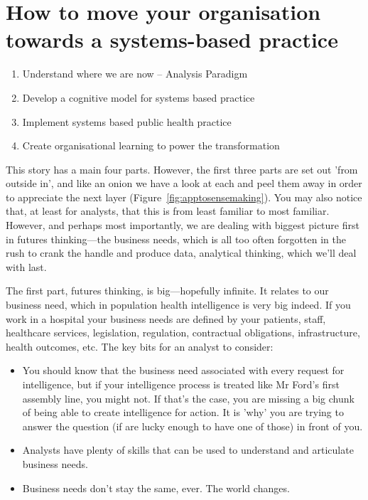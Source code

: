 \section*{How to move your organisation towards a systems-based practice}

\begin{enumerate}
	\item Understand where we are now -- Analysis Paradigm
	\item Develop a cognitive model for systems based practice
	\item Implement systems based public health practice
	\item Create organisational learning to power the transformation
\end{enumerate}

This story has a main four parts. However, the first three parts are set out 'from outside in', and like an onion we have a look at each and peel them away in order to appreciate the next layer (Figure~\ref{fig:apptosensemaking}). You may also notice that, at least for analysts, that this is from least familiar to most familiar. However, and perhaps most importantly, we are dealing with biggest picture first in futures thinking---the business needs, which is all too often forgotten in the rush to crank the handle and produce data, analytical thinking, which we'll deal with last.

The first part, futures thinking, is big---hopefully infinite. It relates to our business need, which in population health intelligence is very big indeed. If you work in a hospital your business needs are defined by your patients, staff, healthcare services, legislation, regulation, contractual obligations, infrastructure, health outcomes, etc. The key bits for an analyst to consider:
\begin{itemize}
	\item You should know that the business need associated with every request for intelligence, but if your intelligence process is treated like Mr Ford's first assembly line, you might not. If that's the case, you are missing a big chunk of being able to create intelligence for action. It is 'why' you are trying to answer the question (if are lucky enough to have one of those) in front of you.
	\item Analysts have plenty of skills that can be used to understand and articulate business needs.
	\item Business needs don't stay the same, ever. The world changes.
\end{itemize}

